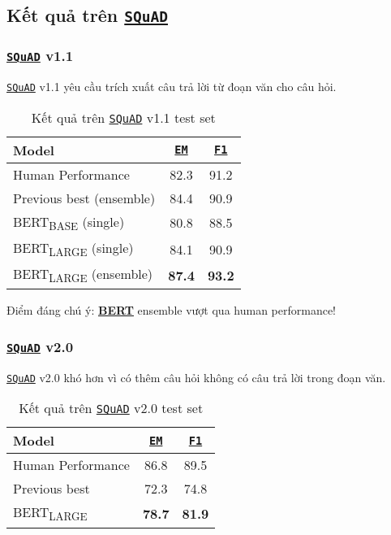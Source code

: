 \subsection{Kết quả trên \hyperref[acro:squad]{\texttt{SQuAD}}}
\label{ssec:ket_qua_squad}

\subsubsection{\hyperref[acro:squad]{\texttt{SQuAD}} v1.1}
\hyperref[acro:squad]{\texttt{SQuAD}} v1.1 yêu
cầu trích xuất câu trả lời từ đoạn văn cho câu hỏi.
\begin{table}[H]
    \centering
    \caption{Kết quả trên \hyperref[acro:squad]{\texttt{SQuAD}} v1.1 test set}
    \label{tab:squad_v1_results}
    \begin{tabular}{lcc}
        \toprule
        \textbf{Model} & \textbf{\hyperref[acro:em]{\texttt{EM}}} & \textbf{\hyperref[acro:f1]{\texttt{F1}}} \\
        \midrule
        Human Performance & 82.3 & 91.2 \\
        Previous best (ensemble) & 84.4 & 90.9 \\
        \midrule
        BERT\textsubscript{BASE} (single) & 80.8
        & 88.5 \\
        BERT\textsubscript{LARGE} (single) & 84.1 & 90.9 \\
        BERT\textsubscript{LARGE} (ensemble) & \textbf{87.4} & \textbf{93.2} \\
        \bottomrule
    \end{tabular}
\end{table}

Điểm đáng chú ý: \hyperref[acro:bert]{\textbf{BERT}} ensemble vượt qua human performance!
\subsubsection{\hyperref[acro:squad]{\texttt{SQuAD}} v2.0}
\hyperref[acro:squad]{\texttt{SQuAD}} v2.0 khó hơn vì có thêm câu hỏi không có câu trả lời trong đoạn văn.
\begin{table}[H]
    \centering
    \caption{Kết quả trên \hyperref[acro:squad]{\texttt{SQuAD}} v2.0 test set}
    \label{tab:squad_v2_results}
    \begin{tabular}{lcc}
        \toprule
        \textbf{Model} & \textbf{\hyperref[acro:em]{\texttt{EM}}} & \textbf{\hyperref[acro:f1]{\texttt{F1}}} \\
        \midrule
        Human Performance & 86.8 & 89.5 \\
        Previous best & 72.3 & 74.8 \\
        \midrule
        BERT\textsubscript{LARGE} & \textbf{78.7} & \textbf{81.9}
        \\
        \bottomrule
    \end{tabular}
\end{table}

